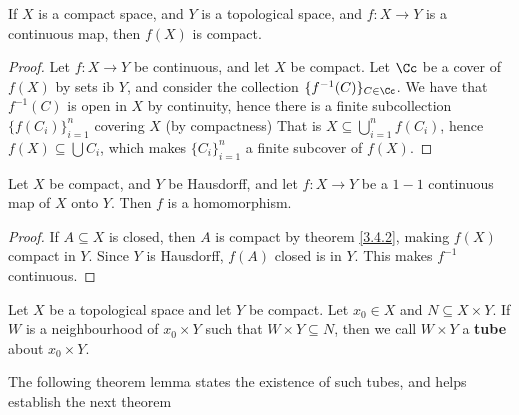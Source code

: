 \begin{theorem}\label{3.4.4}
    If $X$ is a compact space, and  $Y$ is a topological space, and  $f:X \rightarrow Y$ is a
    continuous map, then $f(X)$ is compact.
\end{theorem}
\begin{proof}
    Let $f:X \rightarrow Y$ be continuous, and let $X$ be compact. Let  $\Cc$ be a cover of  $f(X)$
    by sets ib $Y$, and consider the collection  $\{f^{-1}(C)\}_{C \in \Cc}$. We have that
    $f^{-1}(C)$ is open in $X$ by continuity, hence there is a finite subcollection
    $\{f(C_i)\}_{i=1}^n$ covering $X$  (by compactness) That is $X \subseteq
    \bigcup_{i=1}^n{f(C_i)}$, hence $f(X) \subseteq \bigcup{C_i}$, which makes $\{C_i\}_{i=1}^n$ a
    finite subcover of $f(X)$.
\end{proof}

\begin{theorem}\label{3.4.5}
    Let $X$ be compact, and  $Y$ be Hausdorff, and let  $f:X \rightarrow Y$ be a $1-1$ continuous
    map of  $X$ onto  $Y$. Then  $f$ is a homomorphism.
\end{theorem}
\begin{proof}
    If $A \subseteq X$ is closed, then  $A$ is compact by theorem \ref {3.4.2}, making $f(X)$
    compact in $Y$. Since  $Y$ is Hausdorff,  $f(A)$ closed is in $Y$. This makes $f^{-1}$
    continuous.
\end{proof}

\begin{definition}
    Let $X$ be a topological space and let  $Y$ be compact. Let  $x_0 \in X$ and $N \subseteq X
    \times Y$. If  $W$ is a neighbourhood of  $x_0 \times Y$ such that $W \times Y \subseteq N$,
    then we call  $W \times Y$ a  \textbf{tube} about $x_0 \times Y$.
\end{definition}

The following theorem lemma states the existence of such tubes, and helps establish the next theorem

